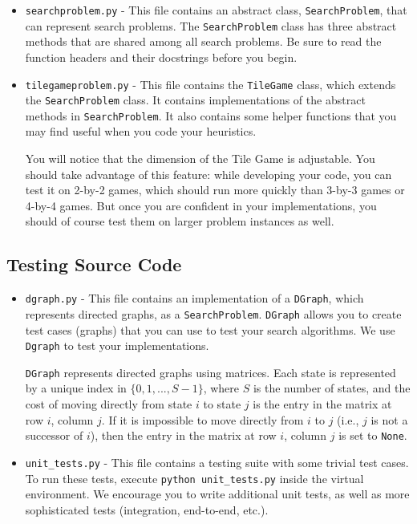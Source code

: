\documentclass{article}
\begin{document}
\begin{itemize}

\item \verb|searchproblem.py| - This file contains an abstract class, \verb|SearchProblem|,
  that can represent search problems.
  The \verb|SearchProblem| class has three abstract methods that are shared among all search problems.
  Be sure to read the function headers and their docstrings before you begin.

\item \verb|tilegameproblem.py| - This file contains the \verb|TileGame| class, which extends the \verb|SearchProblem| class.
  It contains implementations of the abstract methods in \verb|SearchProblem|.
  It also contains some helper functions that you may find useful when you code your heuristics.

  You will notice that the dimension of the Tile Game is adjustable.
  You should take advantage of this feature: while developing your
  code, you can test it on 2-by-2 games, which should run more quickly
  than 3-by-3 games or 4-by-4 games.  But once you are confident in
  your implementations, you should of course test them on larger
  problem instances as well.

\end{itemize}


\subsection{Testing Source Code}

\begin{itemize}

\item \verb|dgraph.py| - This file contains an implementation of a \verb|DGraph|,
  which represents directed graphs, as a \verb|SearchProblem|. \verb|DGraph| allows you to create
  test cases (graphs) that you can use to test your search algorithms. We use \verb|Dgraph|
  to test your implementations.

  \verb|DGraph| represents directed graphs using matrices.
  Each state is represented by a unique index in $\{ 0, 1, ..., S-1 \}$,
  where $S$ is the number of states,
  and the cost of moving directly from state $i$ to state $j$ is the entry in the matrix at row $i$, column $j$.
  If it is impossible to move directly from $i$ to $j$ (i.e., $j$ is not a successor of $i$),
  then the entry in the matrix at row $i$, column $j$ is set to \verb|None|.

\item \verb|unit_tests.py| - This file contains a testing suite with some trivial test cases.
  To run these tests, execute \verb|python unit_tests.py| inside the virtual environment.
  We encourage you to write additional unit tests, as well as more sophisticated tests
  (integration, end-to-end, etc.).

\end{itemize}
\end{document}

